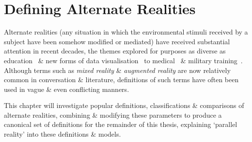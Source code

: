 


\section{Defining Alternate Realities}

Alternate realities (any situation in which the environmental stimuli received by a subject have been somehow modified or mediated) have received substantial attention in recent decades, the themes explored for purposes as diverse as education~\cite{Warburton2009} \& new forms of data visualisation~\cite{Coleman2009} to medical~\cite{TenEyck2011} \& military training~\cite{Qiu2009}. Although terms such as \textit{mixed reality} \& \textit{augmented reality} are now relatively common in conversation \& literature, definitions of such terms have often been used in vague \& even conflicting manners.

This chapter will investigate popular definitions, classifications \& comparisons of alternate realities, combining \& modifying these parameters to produce a canonical set of definitions for the remainder of this thesis, explaining `parallel reality' into these definitions \& models.

